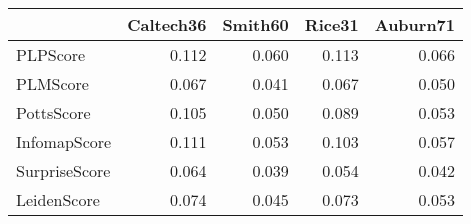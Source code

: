 \begin{tabular}{lrrrr}
\toprule
{} & Caltech36 & Smith60 & Rice31 & Auburn71 \\
\midrule
PLPScore      &     0.112 &   0.060 &  0.113 &    0.066 \\
PLMScore      &     0.067 &   0.041 &  0.067 &    0.050 \\
PottsScore    &     0.105 &   0.050 &  0.089 &    0.053 \\
InfomapScore  &     0.111 &   0.053 &  0.103 &    0.057 \\
SurpriseScore &     0.064 &   0.039 &  0.054 &    0.042 \\
LeidenScore   &     0.074 &   0.045 &  0.073 &    0.053 \\
\bottomrule
\end{tabular}

